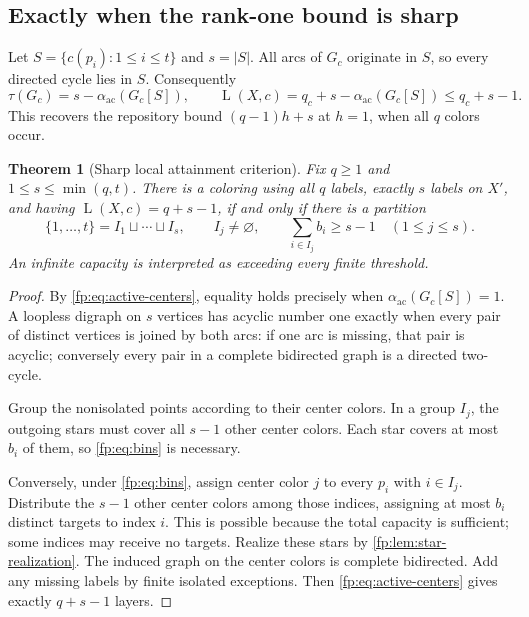 \documentclass[11pt,letterpaper]{article}
\numberwithin{equation}{section}
\newtheorem{theorem}{Theorem}[section]
\theoremstyle{definition}
\theoremstyle{remark}
\theoremstyle{definition}
\newcommand{\layers}{\operatorname{L}}
\newcommand{\ac}{\alpha_{\mathrm{ac}}}
\newcommand{\sq}{\mathbin{\sqcup}}
\begin{document}
\subsection{Exactly when the rank-one bound is sharp}

Let \(S=\{c(p_i):1\leq i\leq t\}\) and \(s=|S|\). All arcs of
\(G_c\) originate in \(S\), so every directed cycle lies in \(S\).
Consequently
\begin{equation}\label{fp:eq:active-centers}
 \tau(G_c)=s-\ac(G_c[S]),\qquad
 \layers(X,c)=q_c+s-\ac(G_c[S])\leq q_c+s-1.
\end{equation}
This recovers the repository bound \((q-1)h+s\) at \(h=1\), when
all \(q\) colors occur.

\begin{theorem}[Sharp local attainment criterion]\label{fp:thm:attainment}
Fix \(q\geq1\) and \(1\leq s\leq\min(q,t)\). There is a coloring
using all \(q\) labels, exactly \(s\) labels on \(X'\), and having
\(\layers(X,c)=q+s-1\), if and only if there is a partition
\begin{equation}\label{fp:eq:bins}
 \{1,\ldots,t\}=I_1\sq\cdots\sq I_s,
 \qquad I_j\ne\varnothing,\qquad
 \sum_{i\in I_j}b_i\geq s-1\quad(1\leq j\leq s).
\end{equation}
An infinite capacity is interpreted as exceeding every finite threshold.
\end{theorem}
\begin{proof}
By \cref{fp:eq:active-centers}, equality holds precisely when
\(\ac(G_c[S])=1\). A loopless digraph on \(s\) vertices has acyclic
number one exactly when every pair of distinct vertices is joined by both
arcs: if one arc is missing, that pair is acyclic; conversely every pair in
a complete bidirected graph is a directed two-cycle.

Group the nonisolated points according to their center colors. In a group
\(I_j\), the outgoing stars must cover all \(s-1\) other center colors.
Each star covers at most \(b_i\) of them, so \cref{fp:eq:bins} is necessary.

Conversely, under \cref{fp:eq:bins}, assign center color \(j\) to every
\(p_i\) with \(i\in I_j\). Distribute the \(s-1\) other center
colors among those indices, assigning at most \(b_i\) distinct targets
to index \(i\). This is possible because the total capacity is sufficient;
some indices may receive no targets. Realize these stars by
\cref{fp:lem:star-realization}. The induced graph on the center colors is
complete bidirected. Add any missing labels by finite isolated exceptions.
Then \cref{fp:eq:active-centers} gives exactly \(q+s-1\) layers.
\end{proof}
\end{document}
